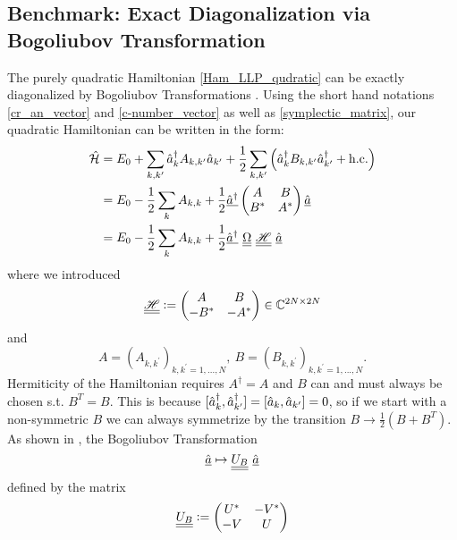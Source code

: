 \subsection{Benchmark: Exact Diagonalization via Bogoliubov Transformation}
The purely quadratic Hamiltonian \ref{Ham_LLP_qudratic} can be exactly diagonalized by Bogoliubov Transformations \cite{PracticalTraining,1980ZPhyB..38..271H}. Using the short hand notations \ref{cr_an_vector} and \ref{c-number_vector} as well as \ref{symplectic_matrix}, our quadratic Hamiltonian can be written in the form:
\begin{align}
\ham &= E_0 + \Sum_{k,k^\prime}\CR_k A_{k,k^\prime}\AN_{k^\prime}+\frac12\Sum_{k,k^\prime}\left(\CR_k B_{k,k^\prime}\CR_{k^\prime}+\mathrm{h.c.}\right)\\
&=E_0-\frac12\Sum_k A_{k,k}+\frac12\underline\CR\begin{pmatrix}A & B\\ B^* & A^*\end{pmatrix}\underline\AN\\
&=E_0-\frac12\Sum_k A_{k,k}+\frac12\underline{\CR}\ {\underline{\underline{\Omega}}}\ {\underline{\underline{\mathscr{H}}}}\ {\underline{\AN}}
\end{align}
where we introduced
\begin{equation}
{\underline{\underline{\mathscr{H}}}}\vcentcolon=\begin{pmatrix}A & B\\ -B^* & -A^*\end{pmatrix}\in\mathbb{C}^{2N\times 2N}
\end{equation}
and
\begin{equation}
A=\left(A_{k,k^\prime}\right)_{k,k^\prime=1,...,N},\ B=\left(B_{k,k^\prime}\right)_{k,k^\prime=1,...,N}.
\end{equation}
Hermiticity of the Hamiltonian requires $A^\dagger=A$ and $B$ can and must always be chosen s.t. $B^T=B$. This is because $[\hat a^\dagger_k,\hat a^\dagger_{k^\prime}]=[\hat a_k,\hat a_{k^\prime}]=0$, so if we start with a non-symmetric $B$ we can always symmetrize by the transition $B\rightarrow \frac12\left(B+B^T\right)$.\\
As shown in \cite{PracticalTraining}, the Bogoliubov Transformation
\begin{equation}\label{Bogoliubov Transformation Def} \underline\AN\mapsto  \underline{\underline{U_B}}\ \underline\AN\end{equation}
defined by the matrix 
\begin{equation}\label{symplectic_U_B}
\underline{\underline{U_B}}\vcentcolon= \begin{pmatrix}U^* & -V^*\\ -V & U\end{pmatrix}
\end{equation}
